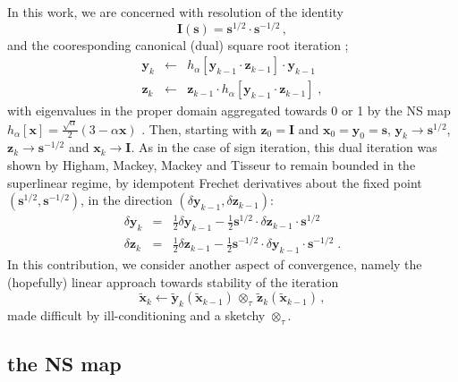 \documentclass[letterpaper,twocolumn,amsmath,amsfont,amssymb,english,aps,jcp,preprintnumbers,groupaddress,nofootinbib,tightenlines,floatfix]{revtex4}
\newcommand{\mat}[1]{\boldsymbol{#1}}
\newcommand{\ot}{  {\scriptstyle \otimes}_{ \tau } }
\theoremstyle{plain}
\theoremstyle{remark}
\theoremstyle{plain}
\begin{document}
In this work, we are concerned with resolution of the identity \cite{}
\begin{equation}
\mat{I} \left( \mat{s} \right) =\mat{s}^{1/2} \cdot \mat{s}^{-1/2} \, ,
\end{equation}
and the cooresponding canonical (dual) square root iteration \cite{};
\begin{eqnarray}\label{cannonical}
\mat{y}_k &\leftarrow& h_\alpha \left[ \mat{y}_{k-1} \cdot \mat{z}_{k-1} \right] \cdot \mat{y}_{k-1}  \nonumber \\
\mat{z}_k &\leftarrow& \mat{z}_{k-1} \cdot h_\alpha \left[ \mat{y}_{k-1} \cdot \mat{z}_{k-1} \right] \; ,
\end{eqnarray}
with eigenvalues in the proper domain aggregated towards 0 or 1 by the
NS map $h_\alpha[\mat{x}]=\frac{\sqrt{\alpha}}{2} \left(3-\alpha
\mat{x} \right)$ \cite{}.  Then, starting with $\mat{z}_0=\mat{I}$ and
$\mat{x}_0=\mat{y}_0=\mat{s}$, ${\mat{y}}_k \rightarrow
\mat{s}^{1/2}$, ${\mat{z}}_k \rightarrow \mat{s}^{-1/2}$ and
${\mat{x}}_k \rightarrow {\mat{I}}$.  As in the case of sign
iteration, this dual iteration was shown by Higham, Mackey, Mackey and
Tisseur \cite{Higham2005} to remain bounded in the superlinear regime,
by idempotent Frechet derivatives about the fixed point
$\left(\mat{s}^{1/2},\mat{s}^{-1/2}\right)$, in the direction $\left(
\delta \mat{y}_{k-1} , \delta \mat{z}_{k-1} \right)$:
\begin{eqnarray}
\delta \mat{y}_k &=& \frac{1}{2} \delta \mat{y}_{k-1} - \frac{1}{2} \mat{s}^{1/2} \cdot \delta \mat{z}_{k-1} \cdot \mat{s}^{1/2} \\
\delta \mat{z}_k &=& \frac{1}{2} \delta \mat{z}_{k-1} - \frac{1}{2} \mat{s}^{-1/2} \cdot \delta \mat{y}_{k-1} \cdot \mat{s}^{-1/2} \;.
\end{eqnarray}
In this contribution, we consider another aspect of convergence,
namely the (hopefully) linear approach towards stability of the
iteration
\begin{equation}
\widetilde{\mat{x}}_k \leftarrow
 \widetilde{\mat{y}}_k \left( \widetilde{\mat{x}}_{k-1} \right)
\, \ot \, \widetilde{\mat{z}}_k \left( \widetilde{\mat{x}}_{k-1} \right) \, ,
\end{equation}
made difficult by ill-conditioning and a sketchy $\ot$.

\subsection{the NS map}
\end{document}
